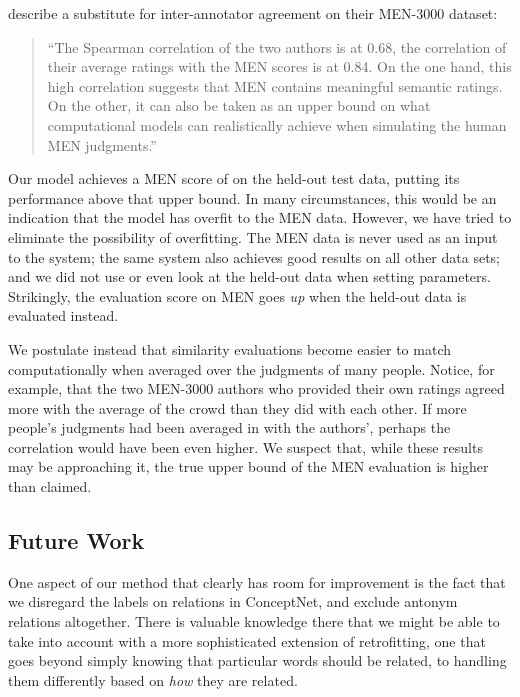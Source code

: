 \documentclass[11pt,letterpaper]{article}
\begin{document}
 describe a substitute for inter-annotator agreement on
their MEN-3000 dataset:

\begin{quote}
``The Spearman correlation of the two authors is at 0.68, the correlation of their
average ratings with the MEN scores is at 0.84. On the one hand, this high
correlation suggests that MEN contains meaningful semantic ratings. On the
other, it can also be taken as an upper bound on what computational models can
realistically achieve when simulating the human MEN judgments.''
\end{quote}

Our model achieves a MEN score of \scoreMEN{} on the
held-out test data, putting its performance above that upper bound. In many
circumstances, this would be an indication that the model has overfit to the
MEN data. However, we have tried to eliminate the possibility of overfitting.
The MEN data is never used as an input to the system; the same system also
achieves good results on all other data sets; and we did not use or even
look at the held-out data when setting parameters. Strikingly, the evaluation
score on MEN goes {\em up} when the held-out data is evaluated instead.

We postulate instead that similarity evaluations become easier to match
computationally when averaged over the judgments of many people. Notice, for
example, that the two MEN-3000 authors who provided their own ratings
agreed more with the average of the crowd than they did with each other.
If more people's judgments had been averaged in with the authors', perhaps the
correlation would have been even higher. We suspect that, while these results
may be approaching it, the true upper bound of the MEN evaluation is higher than
claimed.

\subsection{Future Work}


One aspect of our method that clearly has room for improvement is the fact that
we disregard the labels on relations in ConceptNet, and exclude antonym
relations altogether. There is valuable knowledge there that we might be able
to take into account with a more sophisticated extension of retrofitting, one
that goes beyond simply knowing that particular words should be related, to
handling them differently based on {\em how} they are related.
\end{document}
